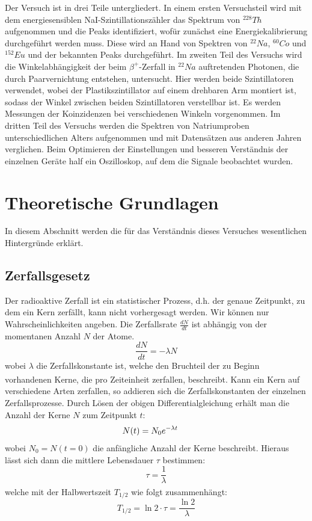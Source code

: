 \documentclass[12pt,listof=totoc]{scrartcl}
\begin{document}
Der Versuch ist in drei Teile untergliedert. 
In einem ersten Versuchsteil wird mit dem energiesensiblen NaI-Szintillationszähler das Spektrum von $^{228}Th$ aufgenommen und die Peaks identifiziert, wofür zunächst eine Energiekalibrierung durchgeführt werden muss. Diese wird an Hand von Spektren von  $^{22}Na$, $^{60}Co$ und $^{152}Eu$ und der bekannten Peaks durchgeführt.
Im zweiten Teil des Versuchs wird die Winkelabhängigkeit der beim $\beta^{+}$-Zerfall in $^{22}Na$ auftretenden Photonen, die durch Paarvernichtung entstehen, untersucht. Hier werden beide Szintillatoren verwendet, wobei der Plastikszintillator auf einem drehbaren Arm montiert ist, sodass der Winkel zwischen beiden Szintillatoren verstellbar ist. Es werden Messungen der Koinzidenzen bei verschiedenen Winkeln vorgenommen.
Im dritten Teil des Versuchs werden die Spektren von Natriumproben unterschiedlichen Alters aufgenommen und mit Datensätzen aus anderen Jahren verglichen.
Beim Optimieren der Einstellungen und besseren Verständnis der einzelnen Geräte half ein Oszilloskop, auf dem die Signale beobachtet wurden.



\newpage
\section{Theoretische Grundlagen}

In diesem Abschnitt werden die für das Verständnis dieses Versuches wesentlichen Hintergründe erklärt.

\subsection{Zerfallsgesetz\label{zerfallsgesetz}}
Der radioaktive Zerfall ist ein statistischer Prozess, d.h. der genaue Zeitpunkt, zu dem ein Kern zerfällt, kann nicht vorhergesagt werden. Wir können nur Wahrscheinlichkeiten angeben. Die Zerfallsrate $\frac{dN}{dt}$ ist abhängig von der momentanen Anzahl $N$ der Atome.
\[\frac{dN}{dt}=-\lambda N\]
wobei $\lambda$ die Zerfallskonstante ist, welche den Bruchteil der zu Beginn vorhandenen Kerne, die pro Zeiteinheit zerfallen, beschreibt\textsuperscript{\cite{Demtröder}}. Kann ein Kern auf verschiedene Arten zerfallen, so addieren sich die Zerfallskonstanten der einzelnen Zerfallsprozesse. Durch Lösen der obigen Differentialgleichung erhält man die Anzahl der Kerne $N$ zum Zeitpunkt $t$:
\[N(t)=N_0e^{-\lambda t}\hspace{0.5cm}\]
wobei $N_0=N(t=0)$ die anfängliche Anzahl der Kerne beschreibt. Hieraus lässt sich dann die mittlere Lebensdauer $\tau$ bestimmen:
\[\tau=\frac{1}{\lambda}\]
welche mit der Halbwertszeit $T_{1/2}$ wie folgt zusammenhängt:\textsuperscript{\cite{Demtröder}}
\[T_{1/2} = \ln2\cdot \tau = \frac{\ln2}{\lambda}\]
 
\end{document}
